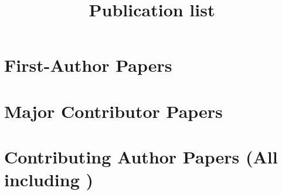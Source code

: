 % 

\title{Publication list}


\noindent



\section*{First-Author Papers}

\begin{etaremune}
    
\end{etaremune}


\section*{Major Contributor Papers}

\begin{etaremune}
    
\end{etaremune}


\section*{Contributing Author Papers {\small (All including \myself)}}




%     





